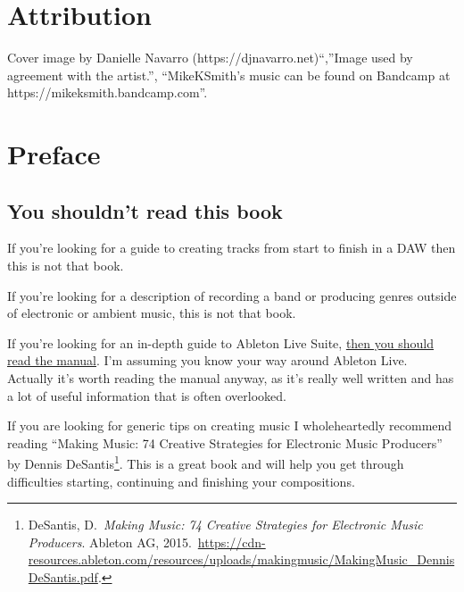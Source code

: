 \documentclass[
  12pt,
  letterpaper,
  oneside,
  open=any]{scrbook}
\renewcommand*\contentsname{Table of contents}
\newcommand\contentsname{Table of contents}
\begin{document}

\renewcommand*\contentsname{Chapters}
{
\hypersetup{linkcolor=}
\setcounter{tocdepth}{1}
\tableofcontents
}

\mainmatter
{}

\chapter*{Attribution}\label{attribution}


Cover image by Danielle Navarro (https://djnavarro.net)``,''Image used
by agreement with the artist.'', ``MikeKSmith's music can be found on
Bandcamp at https://mikeksmith.bandcamp.com''.


\chapter*{Preface}\label{000-Preface}


\section*{You shouldn't read this
book}\label{you-shouldnt-read-this-book}


If you're looking for a guide to creating tracks from start to finish in
a DAW then this is not that book.

If you're looking for a description of recording a band or producing
genres outside of electronic or ambient music, this is not that book.

If you're looking for an in-depth guide to Ableton Live Suite,
\href{https://www.ableton.com/en/manual/welcome-to-live/}{then you
should read the manual}. I'm assuming you know your way around Ableton
Live. Actually it's worth reading the manual anyway, as it's really well
written and has a lot of useful information that is often overlooked.

If you are looking for generic tips on creating music I wholeheartedly
recommend reading ``Making Music: 74 Creative Strategies for Electronic
Music Producers'' by Dennis DeSantis\footnote{DeSantis, D.~\emph{Making
  Music: 74 Creative Strategies for Electronic Music Producers}. Ableton
  AG,
  2015.~\url{https://cdn-resources.ableton.com/resources/uploads/makingmusic/MakingMusic_DennisDeSantis.pdf}.}.
This is a great book and will help you get through difficulties
starting, continuing and finishing your compositions.
\end{document}
